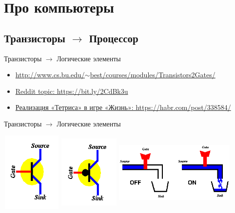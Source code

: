 
\section{Про компьютеры}
\subsection{Транзисторы $\rightarrow$ Процессор}
\begin{frame}[fragile]{Транзисторы $\rightarrow$ Логические элементы}
\begin{itemize}
\item \href{http://www.cs.bu.edu/~best/courses/modules/Transistors2Gates/}{http://www.cs.bu.edu/$\sim$best/courses/modules/Transistors2Gates/}
\item \href{https://www.reddit.com/r/compsci/comments/209fqx/i_want_to_know_how_the_computer_works_from/}{Reddit topic: https://bit.ly/2CdBk3u}
\item \href{https://habr.com/post/338584/}{Реализация «Тетриса» в игре «Жизнь»: https://habr.com/post/338584/}
\end{itemize}
\end{frame}

\begin{frame}[fragile]{Транзисторы $\rightarrow$ Логические элементы}
\begin{multicols}{2}
\includegraphics[width=3cm, height=4cm]{Term_1/Source/Pirctures/transistor-n.png}
\includegraphics[width=3cm, height=4cm]{Term_1/Source/Pirctures/transistor-p.png}
\includegraphics[width=6cm, height=4cm]{Term_1/Source/Pirctures/transistor-as-faucet.png}
\end{multicols}
\end{frame}

